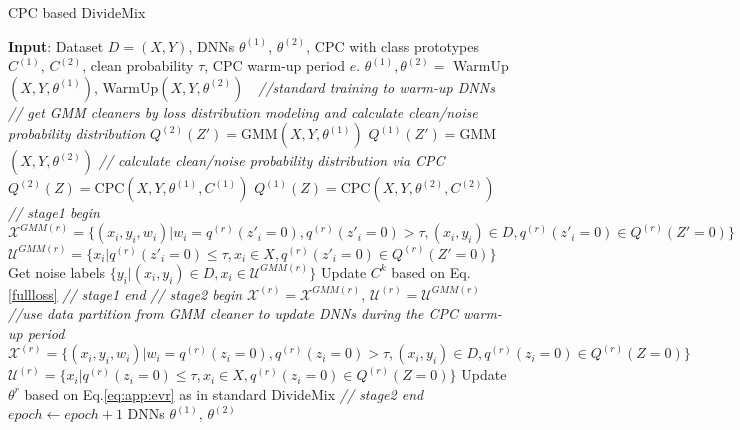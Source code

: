 \documentclass{article} \usepackage{iclr2023_conference,times}
\begin{document}
\begin{algorithm}
\renewcommand{\algorithmicrequire}{\textbf{Input:}}
	\renewcommand{\algorithmicensure}{\textbf{Output:}}
	\caption{CPC based DivideMix}
	\label{alg1}
	\begin{algorithmic}[1]
		\STATE \textbf{Input}: Dataset $D=(X,Y)$, DNNs $\theta^{(1)}$, $\theta^{(2)}$, CPC with class prototypes $C^{(1)}$, $C^{(2)}$, clean probability $\tau$, CPC warm-up period $e$.
		\STATE  $\theta^{(1)}, \theta^{(2)} =$ WarmUp$(X,Y,\theta^{(1)})$, WarmUp$(X,Y, \theta^{(2)})~~~$      \emph{//standard training to warm-up DNNs}
	\STATE \emph{// get GMM cleaners by loss distribution modeling and calculate clean/noise probability distribution }
		\STATE $Q^{(2)}(Z')=$GMM$(X,Y,\theta^{(1)})$
		\STATE $Q^{(1)}(Z')=$GMM$(X,Y,\theta^{(2)})$
	\STATE \emph{// calculate clean/noise probability distribution via CPC}
		\STATE $Q^{(2)}(Z)=$CPC$(X,Y,\theta^{(1)},C^{(1)})$
		\STATE $Q^{(1)}(Z)=$CPC$(X,Y,\theta^{(2)},C^{(2)})$
		\STATE \emph{// stage1 begin}
		\STATE $\mathcal{X}^{GMM(r)}=\{(x_i,y_i,w_i)|w_i=q^{(r)}(z'_i=0), q^{(r)}(z'_i=0) > \tau, (x_i,y_i) \in D, q^{(r)}(z'_i=0) \in Q^{(r)}(Z'=0) \}$
		\STATE $\mathcal{U}^{GMM(r)} = \{x_i| q^{(r)}(z'_i=0) \leq \tau, x_i \in X, q^{(r)}(z'_i=0) \in Q^{(r)}(Z'=0)\} $
		\STATE Get noise labels $\{y_i|(x_i,y_i) \in D, x_i \in \mathcal{U}^{GMM(r)}\}$
		\STATE Update $C^{k}$ based on Eq.\ref{fullloss}
		\STATE \emph{// stage1 end}
		\STATE \emph{// stage2 begin}
        \STATE $\mathcal{X}^{(r)}=\mathcal{X}^{GMM(r)}$, $\mathcal{U}^{(r)}=\mathcal{U}^{GMM(r)}$ \emph{$~~~~~$//use data partition from GMM cleaner to update DNNs during the CPC warm-up period}
        \ELSE
        \STATE $\mathcal{X}^{(r)}=\{(x_i,y_i,w_i)|w_i=q^{(r)}(z_i=0), q^{(r)}(z_i=0) > \tau, (x_i,y_i) \in D , q^{(r)}(z_i=0) \in Q^{(r)}(Z=0)\}$
		\STATE $\mathcal{U}^{(r)} = \{x_i|q^{(r)}(z_i=0) \leq \tau, x_i \in X, q^{(r)}(z_i=0) \in Q^{(r)}(Z=0)\} $
	    \ENDIF
	    \STATE Update $\theta^{r}$ based on Eq.\ref{eq:app:evr} as in standard DivideMix
	    \STATE \emph{// stage2 end}
		\ENDFOR
		\STATE $epoch \leftarrow epoch + 1$
		\ENDWHILE
		\ENSURE  DNNs $\theta^{(1)}$,  $\theta^{(2)}$
	\end{algorithmic}  
\end{algorithm}
\end{document}
